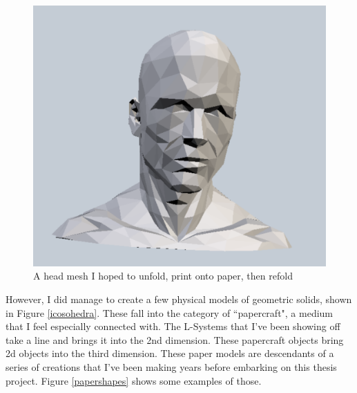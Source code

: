 \documentclass[12pt,twoside]{reedthesis}
\begin{document}
	\begin{figure}[H]
	\centering
	\includegraphics[width=0.5\linewidth]{Images/Head}
	\caption{A head mesh I hoped to unfold, print onto paper, then refold}
	\label{head}
	\end{figure}

	
		However, I did manage to create a few physical models of geometric solids, shown in Figure \ref{icosohedra}. These fall into the category of ``papercraft", a medium that I feel especially connected with. The L-Systems that I've been showing off take a line and brings it into the 2nd dimension. These papercraft objects bring 2d objects into the third dimension. These paper models are descendants of a series of creations that I've been making years before embarking on this thesis project. Figure \ref{papershapes} shows some examples of those.
	
\end{document}

